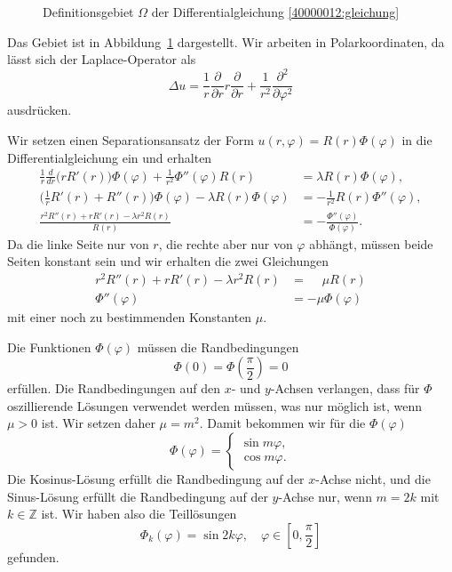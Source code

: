 \begin{loesung}
\begin{figure}
\centering
{}
\caption{Definitionsgebiet $\Omega$ der Differentialgleichung
\eqref{40000012:gleichung}
\label{40000012:gebiet}
}
\end{figure}
Das Gebiet ist in Abbildung~\ref{40000012:gebiet} dargestellt.
Wir arbeiten in Polarkoordinaten, da lässt sich der Laplace-Operator als
\[
\Delta u
=
\frac1r\frac{\partial}{\partial r}r\frac{\partial}{\partial r}
+
\frac1{r^2}
\frac{\partial^2}{\partial\varphi^2}
\]
ausdrücken.
\begin{teilaufgaben}
\item
Wir setzen einen Separationsansatz der Form $u(r,\varphi)=R(r)\Phi(\varphi)$
in die Differentialgleichung ein und erhalten
\begin{align*}
\frac1r\frac{d}{dr}\bigl(rR'(r)\bigr)\Phi(\varphi)
+
\frac1{r^2}
\Phi''(\varphi)R(r)
&=
\lambda R(r)\Phi(\varphi),
\\
\biggl(\frac1rR'(r)+R''(r)\biggr)\Phi(\varphi)
- \lambda R(r)\Phi(\varphi)
&=
-
\frac1{r^2}
R(r)\Phi''(\varphi),
\\
\frac{r^2R''(r)+rR'(r)-\lambda r^2 R(r)}{R(r)}
&=
-\frac{\Phi''(\varphi)}{\Phi(\varphi)}.
\end{align*}
Da die linke Seite nur von $r$, die rechte aber nur von $\varphi$ abhängt,
müssen beide Seiten konstant sein und wir
erhalten die zwei Gleichungen
\begin{align}
r^2R''(r)+rR'(r)-\lambda r^2 R(r)&=\phantom{-}\mu R(r)
\label{40000012:erste}
\\
\Phi''(\varphi)&=-\mu\Phi(\varphi)
\label{40000012:zweite}
\end{align}
mit einer noch zu bestimmenden Konstanten $\mu$.
\item
Die Funktionen $\Phi(\varphi)$ müssen die Randbedingungen
\[
\Phi(0)=\Phi({\textstyle\frac{\pi}2})=0
\]
erfüllen.
Die Randbedingungen auf den $x$- und $y$-Achsen verlangen, dass für $\Phi$
oszillierende Lösungen verwendet werden müssen, was nur möglich ist,
wenn $\mu>0$ ist. Wir setzen daher $\mu=m^2$. Damit bekommen wir für die
$\Phi(\varphi)$
\[
\Phi(\varphi)=\begin{cases}\sin m\varphi,\\\cos m\varphi.\end{cases}
\]
Die Kosinus-Lösung erfüllt die Randbedingung auf der $x$-Achse nicht,
und die Sinus-Lösung erfüllt die Randbedingung auf der $y$-Achse nur,
wenn $m=2k$ mit $k\in\mathbb Z$ ist.
Wir haben also die Teillösungen
\[
\Phi_k(\varphi)=\sin 2k\varphi, \quad\varphi\in[0,{\textstyle \frac{\pi}2}]
\]
gefunden.


\end{teilaufgaben}
\end{loesung}
